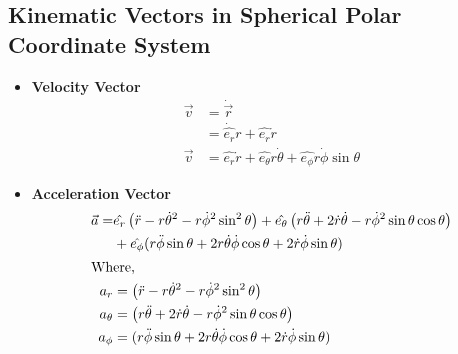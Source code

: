 		\subsection{Kinematic Vectors in Spherical Polar Coordinate System}
		\begin{itemize}
			\item	\textbf{Velocity Vector}\begin{align*}
			\vec{v}&=\dot{\vec{r}}\\&=\dot{\hat{e_{r}}} r+\hat{e_{r}} \dot{r} \\
			\vec{v}&=\hat{e_{r}} \dot{r}+\hat{e_{\theta}} r \dot{\theta}+\hat{e_{\phi}} r \dot{\phi} \sin \theta
			\end{align*}
			\item \textbf{Acceleration Vector}
			\begin{align*}
			\vec{a}=&\hat{e_{r}}\left(\ddot{r}-r \dot{\theta}^{2}-r \dot{\phi}^{2} \sin ^{2} \theta\right)+\hat{e_{\theta}}\left(r \ddot{\theta}+2 \dot{r} \dot{\theta}-r \dot{\phi}^{2} \sin \theta \cos \theta\right)\\&+\hat{e_{\phi}}(r \ddot{\phi} \sin \theta+2 r \dot{\theta} \dot{\phi} \cos \theta+{2 \dot{r} \dot{\phi} \sin \theta})\\
			\intertext{Where,}
			a_{r}&=\left(\ddot{r}-r \dot{\theta}^{2}-r \dot{\phi}^{2} \sin ^{2} \theta\right)\\
			a_{\theta}&=\left(r \ddot{\theta}+2 \dot{r} \dot{\theta}-r \dot{\phi}^{2} \sin \theta \cos \theta\right)\\
			a_{\phi}&=(r \ddot{\phi} \sin \theta+2 r \dot{\theta} \dot{\phi} \cos \theta+2 \dot{r} \dot{\phi} \sin \theta)
			\end{align*} 
			
			\end {itemize}
			
